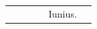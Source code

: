 \documentclass[11pt,openany]{book}
\renewcommand{\\}{\par\hspace*{1em}} %
\begin{document}
\begin{center}
\begin{tabular}{l | l | l | r | l l}
& & & & \color{Red} Iunius. \\

\end{tabular}
\end{center}
\end{document}
